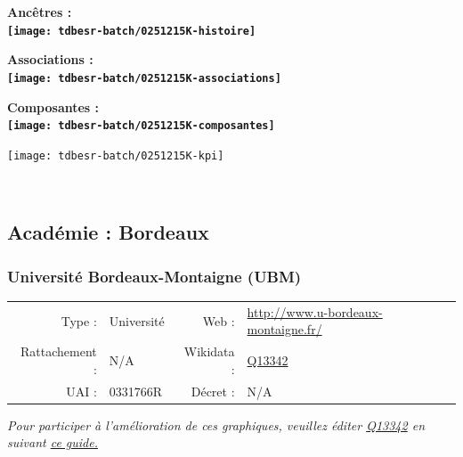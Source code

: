 \documentclass[12pt,french,]{article}
\begin{document}
\vspace{1cm}  
\begin{minipage}[b]{0.50\textwidth}\begin{center} \bf Ancêtres : \\  
\texttt{[image: tdbesr-batch/0251215K-histoire]} \end{center}\end{minipage}\begin{minipage}[b]{0.50\textwidth}\begin{center} \bf Associations : \\  
\texttt{[image: tdbesr-batch/0251215K-associations]} \end{center}\end{minipage}

\hrulefill

\begin{center} \bf Composantes : \\  
\texttt{[image: tdbesr-batch/0251215K-composantes]} \end{center}

\begin{center}\texttt{[image: tdbesr-batch/0251215K-kpi]} \end{center}\checkoddpage

\ifoddpage \fi ~\newpage  

\hypertarget{acaduxe9mie-bordeaux}{%
\subsection{Académie : Bordeaux}\label{acaduxe9mie-bordeaux}}

\hypertarget{universituxe9-bordeaux-montaigne-ubm}{%
\subsubsection{Université Bordeaux-Montaigne
(UBM)}\label{universituxe9-bordeaux-montaigne-ubm}}

\begin{tabular*}{\textwidth}{rp{5cm}rl}  
\hline  
Type : & Université & Web : &\href{http://www.u-bordeaux-montaigne.fr/}{http://www.u-bordeaux-montaigne.fr/} \\  
Rattachement : & N/A & Wikidata : & \href{https://www.wikidata.org/entity/Q13342}{Q13342} \\  
UAI : & 0331766R & Décret : & N/A \\  
\hline  
\end{tabular*}

\textit{\scriptsize Pour participer à l'amélioration de ces graphiques, veuillez éditer  \href{https://www.wikidata.org/entity/Q13342}{Q13342}  en suivant \href{https://github.com/cpesr/wikidataESR/blob/master/Rmd/wikidataESR.md}{ce guide.}}
\end{document}
